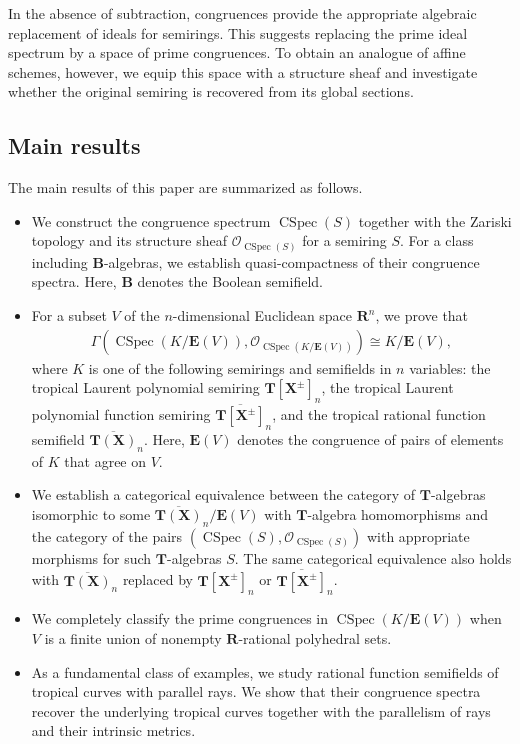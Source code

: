 \documentclass[a4paper,12pt]{amsart}
\theoremstyle{plain}
\theoremstyle{definition}
\begin{document}
In the absence of subtraction, congruences provide the appropriate algebraic replacement of ideals for semirings.
This suggests replacing the prime ideal spectrum by a space of prime congruences.
To obtain an analogue of affine schemes, however, we equip this space with a structure sheaf and investigate whether the original semiring is recovered from its global sections.

\subsection{Main results}
    \label{subsection1.2}

The main results of this paper are summarized as follows.

\begin{itemize}
\item We construct the congruence spectrum $\operatorname{CSpec}(S)$ together with the Zariski topology and its structure sheaf $\mathcal{O}_{\operatorname{CSpec}(S)}$ for a semiring $S$.
For a class including $\boldsymbol{B}$-algebras, we establish quasi-compactness of their congruence spectra.
Here, $\boldsymbol{B}$ denotes the Boolean semifield.
\item For a subset $V$ of the $n$-dimensional Euclidean space $\boldsymbol{R}^n$, we prove that
\begin{align*}
\Gamma(\operatorname{CSpec}(K / \boldsymbol{E}(V)), \mathcal{O}_{\operatorname{CSpec}(K / \boldsymbol{E}(V))}) \cong K / \boldsymbol{E}(V),
\end{align*}
where $K$ is one of the following semirings and semifields in $n$ variables: the tropical Laurent polynomial semiring $\boldsymbol{T}[\boldsymbol{X}^{\pm}]_n$, the tropical Laurent polynomial function semiring $\overline{\boldsymbol{T}[\boldsymbol{X}^{\pm}]}_n$, and the tropical rational function semifield $\overline{\boldsymbol{T}(\boldsymbol{X})}_n$.
Here, $\boldsymbol{E}(V)$ denotes the congruence of pairs of elements of $K$ that agree on $V$.
\item We establish a categorical equivalence between the category of $\boldsymbol{T}$-algebras isomorphic to some $\overline{\boldsymbol{T}(\boldsymbol{X})}_n / \boldsymbol{E}(V)$ with $\boldsymbol{T}$-algebra homomorphisms and the category of the pairs $(\operatorname{CSpec}(S), \mathcal{O}_{\operatorname{CSpec}(S)})$ with appropriate morphisms for such $\boldsymbol{T}$-algebras $S$.
The same categorical equivalence also holds with $\overline{\boldsymbol{T}(\boldsymbol{X})}_n$ replaced by $\boldsymbol{T}[\boldsymbol{X}^{\pm}]_n$ or $\overline{\boldsymbol{T}[\boldsymbol{X}^{\pm}]}_n$.
\item We completely classify the prime congruences in $\operatorname{CSpec}(K / \boldsymbol{E}(V))$ when $V$ is a finite union of nonempty $\boldsymbol{R}$-rational polyhedral sets.
\item As a fundamental class of examples, we study rational function semifields of tropical curves with parallel rays.
We show that their congruence spectra recover the underlying tropical curves together with the parallelism of rays and their intrinsic metrics.
\end{itemize}
\end{document}
